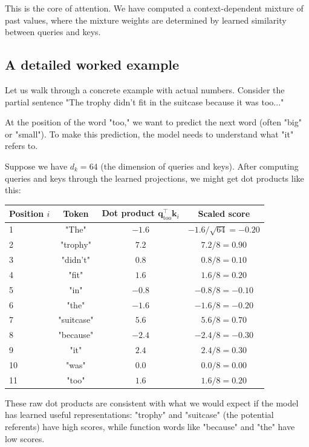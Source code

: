 This is the core of attention. We have computed a context-dependent mixture of past values, where the mixture weights are determined by learned similarity between queries and keys.

\subsection{A detailed worked example}
\label{sec:attn_example}

Let us walk through a concrete example with actual numbers. Consider the partial sentence "The trophy didn't fit in the suitcase because it was too..."

At the position of the word "too," we want to predict the next word (often "big" or "small"). To make this prediction, the model needs to understand what "it" refers to.

Suppose we have $d_k = 64$ (the dimension of queries and keys). After computing queries and keys through the learned projections, we might get dot products like this:

\begin{center}
\begin{tabular}{lccc}
\toprule
\textbf{Position $i$} & \textbf{Token} & \textbf{Dot product} $\mathbf{q}_{\text{too}}^\top \mathbf{k}_i$ & \textbf{Scaled score} \\
\midrule
1 & "The" & $-1.6$ & $-1.6/\sqrt{64} = -0.20$ \\
2 & "trophy" & $7.2$ & $7.2/8 = 0.90$ \\
3 & "didn't" & $0.8$ & $0.8/8 = 0.10$ \\
4 & "fit" & $1.6$ & $1.6/8 = 0.20$ \\
5 & "in" & $-0.8$ & $-0.8/8 = -0.10$ \\
6 & "the" & $-1.6$ & $-1.6/8 = -0.20$ \\
7 & "suitcase" & $5.6$ & $5.6/8 = 0.70$ \\
8 & "because" & $-2.4$ & $-2.4/8 = -0.30$ \\
9 & "it" & $2.4$ & $2.4/8 = 0.30$ \\
10 & "was" & $0.0$ & $0.0/8 = 0.00$ \\
11 & "too" & $1.6$ & $1.6/8 = 0.20$ \\
\bottomrule
\end{tabular}
\end{center}

These raw dot products are consistent with what we would expect if the model has learned useful representations: "trophy" and "suitcase" (the potential referents) have high scores, while function words like "because" and "the" have low scores.

